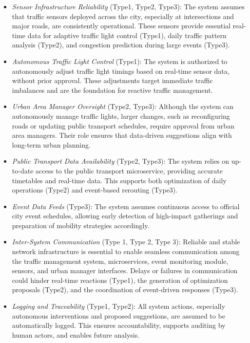 \documentclass[a4paper,12pt]{article}
\begin{document}
\begin{itemize}

    \item \textit{Sensor Infrastructure Reliability} (Type1, Type2, Type3): The system assumes that traffic sensors deployed across the city, especially at intersections and major roads, are consistently operational. These sensors provide essential real-time data for adaptive traffic light control (Type1), daily traffic pattern analysis (Type2), and congestion prediction during large events (Type3).

    \item \textit{Autonomous Traffic Light Control} (Type1): The system is authorized to autonomously adjust traffic light timings based on real-time sensor data, without prior approval. These adjustments target immediate traffic imbalances and are the foundation for reactive traffic management.

    \item \textit{Urban Area Manager Oversight} (Type2, Type3): Although the system can autonomously manage traffic lights, larger changes, such as reconfiguring roads or updating public transport schedules, require approval from urban area managers. Their role ensures that data-driven suggestions align with long-term urban planning.

    \item \textit{Public Transport Data Availability} (Type2, Type3): The system relies on up-to-date access to the public transport microservice, providing accurate timetables and real-time data. This supports both optimization of daily operations (Type2) and event-based rerouting (Type3).

    \item \textit{Event Data Feeds} (Type3): The system assumes continuous access to official city event schedules, allowing early detection of high-impact gatherings and preparation of mobility strategies accordingly.

    \item \textit{Inter-System Communication} (Type 1, Type 2, Type 3): Reliable and stable network infrastructure is essential to enable seamless communication among the traffic management system, microservices, event monitoring module, sensors, and urban manager interfaces. Delays or failures in communication could hinder real-time reactions (Type1), the generation of optimization proposals (Type2), and the coordination of event-driven responses (Type3).

    \item \textit{Logging and Traceability} (Type1, Type2): All system actions, especially autonomous interventions and proposed suggestions, are assumed to be automatically logged. This ensures accountability, supports auditing by human actors, and enables future analysis.


\end{itemize}
\end{document}
